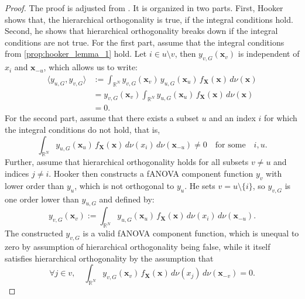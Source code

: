 \begin{proof}
    The proof is adjusted from \cite{hooker2007}. It is organized in two parts. First, Hooker shows that, the hierarchical orthogonality is true, if the integral conditions hold. Second, he shows that hierarchical orthogonality breaks down if the integral conditions are not true.
    For the first part, assume that the integral conditions from \autoref{prop:hooker_lemma_1} hold. Let $i \in u \setminus v$, then $y_{v, G}(\boldsymbol{x}_v)$ is independent of $x_i$ and $\boldsymbol{x}_{-u}$, which allows us to write:
\begin{align*}
\langle y_{u, G}, y_{v, G} \rangle 
&:= \int_{\mathbb{R}^N} 
        y_{v, G}(\boldsymbol{x}_v)\, y_{u, G}(\boldsymbol{x}_u)\, 
        f_{\boldsymbol{X}}(\boldsymbol{x})\, 
        d \nu(\boldsymbol{x}) \\[0.3em]
&= y_{v, G}(\boldsymbol{x}_v) 
   \int_{\mathbb{R}^N} 
        y_{u, G}(\boldsymbol{x}_u)\, 
        f_{\boldsymbol{X}}(\boldsymbol{x})\, 
        d \nu(\boldsymbol{x}) \\[0.3em]
&= 0.
\end{align*}
For the second part, assume that there exists a subset $u$ and an index $i$ for which the integral conditions do not hold, that is,
\begin{equation*}
    \int_{\mathbb{R}^N} y_{u, G}(\boldsymbol{x}_u)\, f_{\boldsymbol{X}}(\boldsymbol{x})\, d \nu (x_i)\, d \nu (\boldsymbol{x}_{-u}) \ne 0 
    \quad \text{for some} \quad i, u.
\end{equation*}
Further, assume that hierarchical orthogonality holds for all subsets $v \neq u$ and indices $j \neq i$. 
Hooker then constructs a fANOVA component function $y_v$ with lower order than $y_u$, which is not orthogonal to $y_u$. 
He sets $v = u \setminus \{i\}$, so $y_{v, G}$ is one order lower than $y_{u, G}$ and defined by:
\begin{equation*}
    y_{v, G}(\boldsymbol{x}_v) := \int_{\mathbb{R}^N} y_{u, G}(\boldsymbol{x}_u) \, f_{\boldsymbol{X}}(\boldsymbol{x}) \, d \nu (x_i) \, d \nu (\boldsymbol{x}_{-u}).
\end{equation*}
The constructed \(y_{v, G}\) is a valid fANOVA component function, which is unequal to zero by assumption of hierarchical orthogonality being false, while it itself satisfies hierarchical orthogonality by the assumption that
\begin{equation*}
    \forall j \in v, \quad \int_{\mathbb{R}^N} y_{v, G}(\boldsymbol{x}_v) \, f_{\boldsymbol{X}}(\boldsymbol{x}) \, d \nu (x_j) \, d \nu (\boldsymbol{x}_{-v}) = 0.

\end{equation*}
\end{proof}
